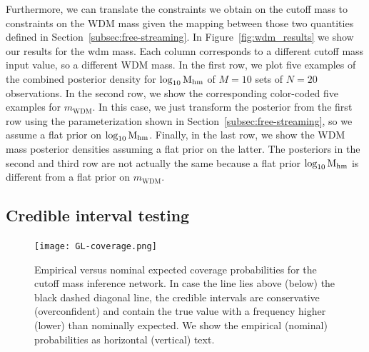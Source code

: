 Furthermore, we can translate the constraints we obtain on the cutoff mass to constraints on the WDM mass given the mapping between those two quantities defined in Section~\ref{subsec:free-streaming}. In Figure~\ref{fig:wdm_results} we show  our results for the \gls*{wdm} mass. Each column corresponds to a different cutoff mass input value, so a different WDM mass. In the first row, we plot five examples of the combined posterior density for $\log_{10}\mathrm{M_{hm}}$ of $M=10$ sets of $N=20$ observations. In the second row, we show the corresponding color-coded five examples for $m_{\mathrm{WDM}}$. In this case, we just transform the posterior from the first row using the parameterization shown in Section~\ref{subsec:free-streaming}, so we assume a flat prior on $\log_{10}\mathrm{M_{hm}}$. Finally, in the last row, we show the WDM mass posterior densities assuming a flat prior on the latter. The posteriors in the second and third row are not actually the same because a flat prior $\log_{10}\mathrm{M_{hm}}$ is different from a flat prior on $m_{\mathrm{WDM}}$.

\subsection{Credible interval testing}
\label{subsec:test}

\begin{figure}
    \centering
    \texttt{[image: GL-coverage.png]}
    \caption{Empirical versus nominal expected coverage probabilities for the cutoff mass inference network. In case the line lies above (below) the black dashed diagonal line, the credible intervals are conservative (overconfident) and contain the true value with a frequency higher (lower) than nominally expected. We show the empirical (nominal) probabilities as horizontal (vertical) text.
}
\label{fig:coverage}
\end{figure}

